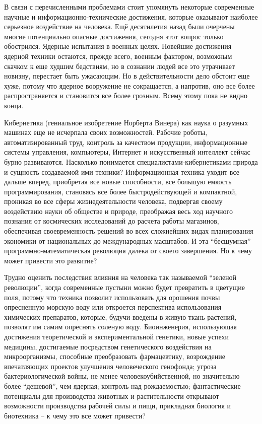В связи с перечисленными проблемами стоит упомянуть некоторые современные научные и информационно-технические достижения, которые оказывают наиболее серьезное воздействие на человека. Ещё десятилетия назад были очерчены многие потенциально опасные достижения, сегодня этот вопрос только обострился. Ядерные испытания в военных целях. Новейшие достижения ядерной техники остаются, прежде всего, военным фактором, возможным скачком к еще худшим бедствиям, но в сознании людей все это утрачивает новизну, перестает быть ужасающим. Но в действительности дело обстоит еще хуже, потому что ядерное вооружение не сокращается, а напротив, оно все более распространяется и становится все более грозным. Всему этому пока не видно конца.

Кибернетика (гениальное изобретение Норберта Винера) как наука о разумных машинах еще не исчерпала своих возможностей. Рабочие роботы, автоматизированный труд, контроль за качеством продукции, информационные системы управления, компьютеры, Интернет и искусственный интеллект сейчас бурно развиваются. Насколько понимается специалистами-кибернетиками природа и сущность создаваемой ими техники? Информационная техника уходит все дальше вперед, приобретая все новые способности, все большую емкость программирования, становясь все более быстродействующей и компактной, проникая во все сферы жизнедеятельности человека, подвергая своему воздействию науки об обществе и природе, преображая весь ход научного познания от космических исследований до расчета работы магазинов, обеспечивая своевременность решений во всех сложнейших видах планирования экономики от национальных до международных масштабов. И эта ``бесшумная'' программно-математическая революция далека от своего завершения. Но к чему может привести это развитие?

Трудно оценить последствия влияния на человека так называемой ``зеленой революции'', когда современные пустыни можно будет превратить в цветущие поля, потому что техника позволит использовать для орошения почвы опресненную морскую воду или откроется перспектива использования химических препаратов, которые, будучи введены в живую ткань растений, позволят им самим опреснять соленую воду.  Биоинженерия, использующая достижения теоретической и экспериментальной генетики, новые успехи медицины, достигаемые посредством генетического воздействия на микроорганизмы, способные преобразовать фармацевтику, возрождение впечатляющих проектов улучшения человеческого генофонда; угроза бактериологической войны, не менее человекоубийственной, но значительно более ``дешевой'', чем ядерная; контроль над рождаемостью; фантастические потенциалы для производства животных и растительности открывают возможности производства рабочей силы и пищи, прикладная биология и биотехника – к чему это все может привести?

